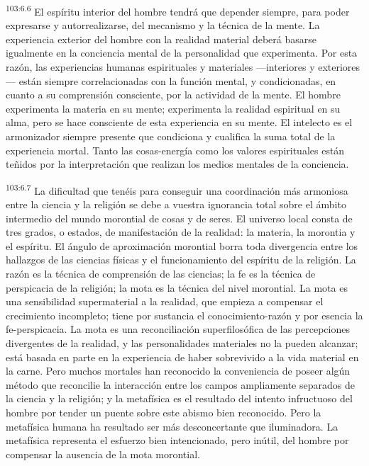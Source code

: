 \par
\textsuperscript{103:6.6} El espíritu interior del hombre tendrá que depender siempre, para poder expresarse y autorrealizarse, del mecanismo y la técnica de la mente. La experiencia exterior del hombre con la realidad material deberá basarse igualmente en la conciencia mental de la personalidad que experimenta. Por esta razón, las experiencias humanas espirituales y materiales ---interiores y exteriores--- están siempre correlacionadas con la función mental, y condicionadas, en cuanto a su comprensión consciente, por la actividad de la mente. El hombre experimenta la materia en su mente; experimenta la realidad espiritual en su alma, pero se hace consciente de esta experiencia en su mente. El intelecto es el armonizador siempre presente que condiciona y cualifica la suma total de la experiencia mortal. Tanto las cosas-energía como los valores espirituales están teñidos por la interpretación que realizan los medios mentales de la conciencia.

\par
\textsuperscript{103:6.7} La dificultad que tenéis para conseguir una coordinación más armoniosa entre la ciencia y la religión se debe a vuestra ignorancia total sobre el ámbito intermedio del mundo morontial de cosas y de seres. El universo local consta de tres grados, o estados, de manifestación de la realidad: la materia, la morontia y el espíritu. El ángulo de aproximación morontial borra toda divergencia entre los hallazgos de las ciencias físicas y el funcionamiento del espíritu de la religión. La razón es la técnica de comprensión de las ciencias; la fe es la técnica de perspicacia de la religión; la mota es la técnica del nivel morontial. La mota es una sensibilidad supermaterial a la realidad, que empieza a compensar el crecimiento incompleto; tiene por sustancia el conocimiento-razón y por esencia la fe-perspicacia. La mota es una reconciliación superfilosófica de las percepciones divergentes de la realidad, y las personalidades materiales no la pueden alcanzar; está basada en parte en la experiencia de haber sobrevivido a la vida material en la carne. Pero muchos mortales han reconocido la conveniencia de poseer algún método que reconcilie la interacción entre los campos ampliamente separados de la ciencia y la religión; y la metafísica es el resultado del intento infructuoso del hombre por tender un puente sobre este abismo bien reconocido. Pero la metafísica humana ha resultado ser más desconcertante que iluminadora. La metafísica representa el esfuerzo bien intencionado, pero inútil, del hombre por compensar la ausencia de la mota morontial.

